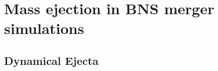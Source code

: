 \section{Mass ejection in \ac{BNS} merger simulations} \label{sec:bns_sims:ejecta}






\subsection{Dynamical Ejecta} \label{sec:bns_sims:dyn}



